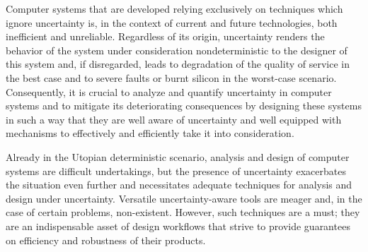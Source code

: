 Computer systems that are developed relying exclusively on techniques which
ignore uncertainty is, in the context of current and future technologies, both
inefficient and unreliable. Regardless of its origin, uncertainty renders the
behavior of the system under consideration nondeterministic to the designer of
this system and, if disregarded, leads to degradation of the quality of service
in the best case and to severe faults or burnt silicon in the worst-case
scenario. Consequently, it is crucial to analyze and quantify uncertainty in
computer systems and to mitigate its deteriorating consequences by designing
these systems in such a way that they are well aware of uncertainty and well
equipped with mechanisms to effectively and efficiently take it into
consideration.

Already in the Utopian deterministic scenario, analysis and design of computer
systems are difficult undertakings, but the presence of uncertainty exacerbates
the situation even further and necessitates adequate techniques for analysis and
design under uncertainty. Versatile uncertainty-aware tools are meager and, in
the case of certain problems, non-existent. However, such techniques are a must;
they are an indispensable asset of design workflows that strive to provide
guarantees on efficiency and robustness of their products.
